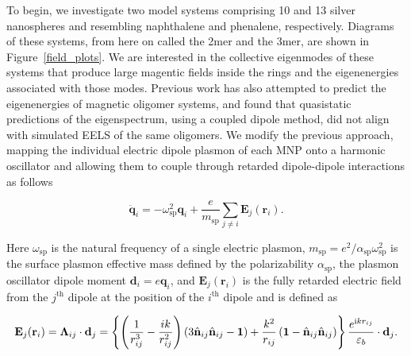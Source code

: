 \documentclass[journal=apchd5,manuscript=article]{achemso}
\begin{document}
To begin, we investigate two model systems comprising 10 and 13 silver nanospheres and resembling naphthalene and phenalene, respectively. Diagrams of these systems, from here on called the 2mer and the 3mer, are shown in Figure~\ref{field_plots}. We are interested in the collective eigenmodes of these systems that produce large magentic fields inside the rings and the eigenenergies associated with those modes. Previous work has also attempted to predict the eigenenergies of magnetic oligomer systems, and found that quasistatic predictions of the eigenspectrum, using a coupled dipole method, did not align with simulated EELS of the same oligomers.\cite{Cherqui2014} We modify the previous approach, mapping the individual electric dipole plasmon of each MNP onto a harmonic oscillator and allowing them to couple through retarded dipole-dipole interactions as follows\cite{ARPC}

\begin{equation}
\ddot{\textbf{q}}_i = -\omega_{\textrm{sp}}^2\textbf{q}_i + \frac{e}{m_{\textrm{sp}}}\sum_{j\neq i}\textbf{E}_j(\textbf{r}_i).
\label{equation_of_motion}
\end{equation}

\noindent Here $\omega_{\textrm{sp}}$ is the natural frequency of a single electric plasmon, $m_{\textrm{sp}} = e^2/\alpha_{\textrm{sp}}\omega_{\textrm{sp}}^2$ is the surface plasmon effective mass defined by the polarizability $\alpha_{\textrm{sp}}$, the plasmon oscillator dipole moment $\textbf{d}_i = e\textbf{q}_i$, and $\textbf{E}_j(\textbf{r}_i)$ is the fully retarded electric field from the $j^{\textrm{th}}$ dipole at the position of the $i^{\textrm{th}}$ dipole and is defined as 

\begin{equation}
\textbf{E}_j(\textbf{r}_i) = \boldsymbol{\Lambda}_{ij}\cdot\textbf{d}_j\\
= \left\{\left(\frac{1}{r_{ij}^3} - \frac{ik}{r_{ij}^2}\right)\left(3\hat{\textbf{n}}_{ij}\hat{\textbf{n}}_{ij} - \textbf{1}\right) + \frac{k^2}{r_{ij}}\left(\textbf{1}-\hat{\textbf{n}}_{ij}\hat{\textbf{n}}_{ij}\right)\right\}\frac{e^{\textrm{i}kr_{ij}}}{\varepsilon_b}\cdot\textbf{d}_j.
\label{electric_field_lambda}
\end{equation}
\end{document}
